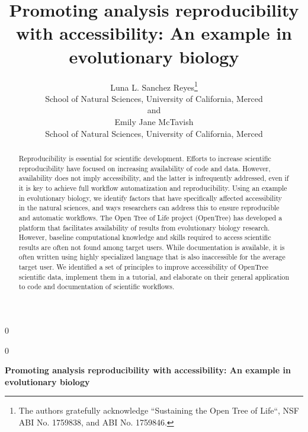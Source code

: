 \documentclass[12pt]{article}
\newcommand{\blind}{0}
\begin{document}
%
%


\def\spacingset#1{\renewcommand{\baselinestretch}%
{#1}\small\normalsize} \spacingset{1}



\blind
{
  \title{\bf Promoting analysis reproducibility with accessibility: An example in evolutionary biology}
  \author{Luna L. Sanchez Reyes\thanks{
    The authors gratefully acknowledge ``Sustaining the Open Tree of Life``, NSF ABI No. 1759838, and ABI No. 1759846.}\hspace{.2cm}\\
    School of Natural Sciences, University of California, Merced\\
    and \\
    Emily Jane McTavish \\
    School of Natural Sciences, University of California, Merced}
  \maketitle
} \fi

\blind
{
  \bigskip
  \bigskip
  \bigskip
  \begin{center}
    {\LARGE\bf Promoting analysis reproducibility with accessibility: An example in evolutionary biology}
\end{center}
  \medskip
} \fi

\bigskip
\begin{abstract}
Reproducibility is essential for scientific development. Efforts
to increase scientific reproducibility have focused on increasing availability
of code and data. However, availability does not imply accessibility, and the latter
is infrequently addressed, even if it is key to achieve full workflow automatization
and reproducibility. Using an example in evolutionary biology, we identify factors
that have specifically affected accessibility in
the natural sciences, and ways researchers can address this to ensure reproducible
and automatic workflows.
The Open Tree of Life project (OpenTree) has developed a platform that facilitates
availability of results from evolutionary biology research. However, baseline
computational knowledge and skills required to
access scientific results are often not found among target users. While documentation
is available, it is often written using highly specialized language that is also
 inaccessible for the average target user.
We identified a set of principles to improve accessibility of OpenTree scientific data,
implement them in a tutorial, and elaborate on their general application to code and
documentation of scientific workflows.



\end{abstract}
\end{document}
